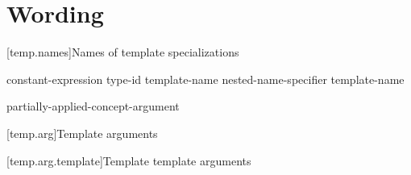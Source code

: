 \documentclass{wg21}
\begin{document}
\section{Wording}

[temp.names]{Names of template specializations}


\begin{bnf}
\br
constant-expression\br
type-id\br
{} template-name\br
nested-name-specifier  template-name\br
\begin{addedblock}
partially-applied-concept-argument
\end{addedblock}
\end{bnf}


[temp.arg]{Template arguments}

[temp.arg.template]{Template template arguments}

\end{document}
